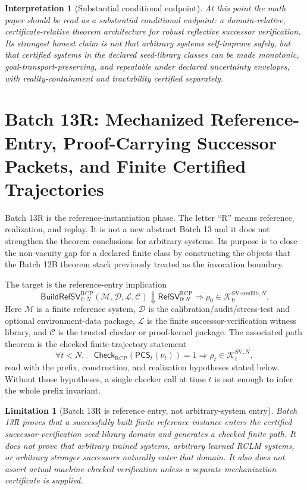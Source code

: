 \documentclass[11pt]{article}
\newtheorem{interpretation}[theorem]{Interpretation}
\newtheorem{limitation}[theorem]{Limitation}
\newcommand{\1}{\mathbf{1}}
\newcommand{\RCP}{\mathrm{RCP}}
\providecommand{\Kcal}{\mathcal{K}}
\begin{document}
\begin{interpretation}[Substantial conditional endpoint]
\label{interp:rcp2_substantial_conditional_endpoint}
At this point the math paper should be read as a substantial conditional endpoint: a domain-relative, certificate-relative theorem architecture for robust reflective successor verification. Its strongest honest claim is not that arbitrary systems self-improve safely, but that certified systems in the declared seed-library classes can be made monotonic, goal-transport-preserving, and repeatable under declared uncertainty envelopes, with reality-containment and tractability certified separately.
\end{interpretation}




\section{Batch 13R: Mechanized Reference-Entry, Proof-Carrying Successor Packets, and Finite Certified Trajectories}
\label{sec:batch13r_reference_entry_proof_carrying}

Batch 13R is the reference-instantiation phase.  The letter ``R'' means reference, realization, and replay.  It is not a new abstract Batch 13 and it does not strengthen the theorem conclusions for arbitrary systems.  Its purpose is to close the non-vacuity gap for a declared finite class by constructing the objects that the Batch 12B theorem stack previously treated as the invocation boundary.

The target is the reference-entry implication
\[
\boxed{
\mathsf{BuildRefSV}_{0:N}^{\RCP}(\mathcal M,\mathcal D,\mathcal L,\mathcal C)
\Downarrow
\mathsf{RefSV}_{0:N}^{\RCP}
\Longrightarrow
\rho_0\in\Kcal_0^{\mathrm{SV\mbox{-}seedlib},N}.
}
\]
Here \(\mathcal M\) is a finite reference system, \(\mathcal D\) is the calibration/audit/stress-test and optional environment-data package, \(\mathcal L\) is the finite successor-verification witness library, and \(\mathcal C\) is the trusted checker or proof-kernel package.  The associated path theorem is the checked finite-trajectory statement
\[
\boxed{
\forall t<N,\quad
\mathsf{Check}_{\RCP}(\mathsf{PCS}_t(\nu_t))=1
\Longrightarrow
\rho_t\in\Kcal_t^{\mathrm{SV},N},
}
\]
read with the prefix, construction, and realization hypotheses stated below.  Without those hypotheses, a single checker call at time \(t\) is not enough to infer the whole prefix invariant.

\begin{limitation}[Batch 13R is reference entry, not arbitrary-system entry]
Batch 13R proves that a successfully built finite reference instance enters the certified successor-verification seed-library domain and generates a checked finite path.  It does not prove that arbitrary trained systems, arbitrary learned RCLM systems, or arbitrary stronger successors naturally enter that domain.  It also does not assert actual machine-checked verification unless a separate mechanization certificate is supplied.
\end{limitation}
\end{document}

